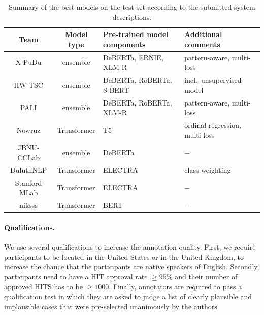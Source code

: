 \documentclass[11pt]{article}
\begin{document}
\begin{table}[!ht]
    \centering
    \begin{tabular}{ccll}
    \toprule
    Team & Model type & Pre-trained model components & Additional comments \\
    \midrule
    X-PuDu & ensemble & DeBERTa, ERNIE, XLM-R & pattern-aware, multi-loss\\
    HW-TSC & ensemble & DeBERTa, RoBERTa, S-BERT & incl.~unsupervised model\\
    PALI & ensemble & DeBERTa, RoBERTa, XLM-R & pattern-aware, multi-loss\\
    Nowruz & Transformer & T5 & ordinal regression, multi-loss\\
    JBNU-CCLab & ensemble & DeBERTa & $-$\\
    DuluthNLP & Transformer & ELECTRA & class weighting \\
    Stanford MLab & Transformer & ELECTRA & $-$\\
    niksss & Transformer & BERT & $-$\\    
    \bottomrule
    \end{tabular}
    \caption{Summary of the best models on the test set according to the submitted system descriptions.}
    \label{tab:systems}
\end{table}


\paragraph{Qualifications.} We use several qualifications to increase the annotation quality. First, we require participants to be located in the United States or in the United Kingdom, to increase the chance that the participants are native speakers of English. Secondly, participants need to have a HIT approval rate $\ge 95\%$ and their number of approved HITS has to be $\ge 1000$. Finally, annotators are required to pass a qualification test in which they are asked to judge a list of clearly plausible and implausible cases that were pre-selected unanimously by the authors.
\end{document}
